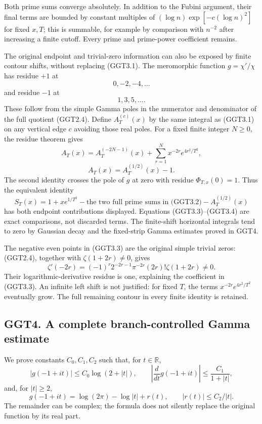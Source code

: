Both prime sums converge absolutely. In addition to the Fubini argument,
their final terms are bounded by constant multiples of
\((\log n)\exp[-c(\log n)^2]\) for fixed \(x,T\); this is summable, for
example by comparison with \(n^{-2}\) after increasing a finite cutoff.
Every prime and prime-power coefficient remains.

The original endpoint and trivial-zero information can also be exposed
by finite contour shifts, without replacing (GGT3.1). The meromorphic
function \(g=\chi'/\chi\) has residue \(+1\) at \[
0,-2,-4,\ldots
\] and residue \(-1\) at \[
1,3,5,\ldots.
\] These follow from the simple Gamma poles in the numerator and
denominator of the full quotient (GGT2.4). Define \(A_T^{(c)}(x)\) by
the same integral as (GGT3.1) on any vertical edge \(c\) avoiding those
real poles. For a fixed finite integer \(N\ge0\), the residue theorem
gives \[
A_T(x)
=A_T^{(-2N-1)}(x)
+\sum_{r=1}^{N}x^{-2r}e^{4r^2/T^2},
\tag{GGT3.3}
\] \[
A_T(x)=A_T^{(1/2)}(x)-1.
\tag{GGT3.4}
\] The second identity crosses the pole of \(g\) at zero with residue
\(\Phi_{T,x}(0)=1\). Thus the equivalent identity \[
S_T(x)=1+x e^{1/T^2}
-\text{the two full prime sums in (GGT3.2)}
-A_T^{(1/2)}(x)
\tag{GGT3.5}
\] has both endpoint contributions displayed. Equations
(GGT3.3)--(GGT3.4) are exact comparisons, not discarded terms. The
finite-shift horizontal integrals tend to zero by Gaussian decay and the
fixed-strip Gamma estimates proved in GGT4.

The negative even points in (GGT3.3) are the original simple trivial
zeros: (GGT2.4), together with \(\zeta(1+2r)\ne0\), gives \[
\zeta'(-2r)=(-1)^r2^{-2r-1}\pi^{-2r}(2r)!\zeta(1+2r)\ne0.
\tag{GGT3.6}
\] Their logarithmic-derivative residue is one, explaining the
coefficient in (GGT3.3). An infinite left shift is not justified: for
fixed \(T\), the terms \(x^{-2r}e^{4r^2/T^2}\) eventually grow. The full
remaining contour in every finite identity is retained.

\subsection{GGT4. A complete branch-controlled Gamma
estimate}\label{ggt4.-a-complete-branch-controlled-gamma-estimate}

We prove constants \(C_0,C_1,C_2\) such that, for \(t\in\mathbb R\), \[
|g(-1+it)|\le C_0\log(2+|t|),\qquad
\left|\frac d{dt}g(-1+it)\right|
\le\frac{C_1}{1+|t|},
\tag{GGT4.1}
\] and, for \(|t|\ge2\), \[
g(-1+it)=\log(2\pi)-\log|t|+r(t),
\qquad |r(t)|\le C_2/|t|.
\tag{GGT4.2}
\] The remainder can be complex; the formula does not silently replace
the original function by its real part.

